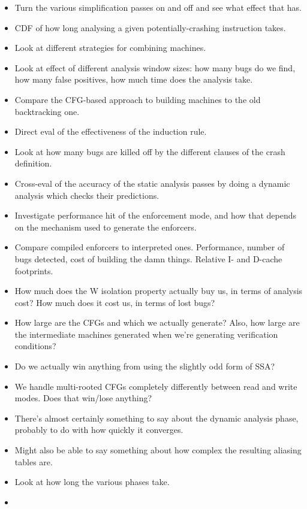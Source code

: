 \begin{itemize}
\item
  Turn the various simplification passes on and off and see what effect that has.
\item
  CDF of how long analysing a given potentially-crashing instruction takes.
\item
  Look at different strategies for combining machines.
\item
  Look at effect of different analysis window sizes: how many bugs do we find, how many false positives, how much time does the analysis take.
\item
  Compare the CFG-based approach to building machines to the old backtracking one.
\item
  Direct eval of the effectiveness of the induction rule.
\item
  Look at how many bugs are killed off by the different clauses of the crash definition.
\item
  Cross-eval of the accuracy of the static analysis passes by doing a dynamic analysis which checks their predictions.
\item
  Investigate performance hit of the enforcement mode, and how that depends on the mechanism used to generate the enforcers.
\item
  Compare compiled enforcers to interpreted ones.
  Performance, number of bugs detected, cost of building the damn things.
  Relative I- and D-cache footprints.
\item
  How much does the W isolation property actually buy us, in terms of analysis cost?
  How much does it cost us, in terms of lost bugs?
\item
  How large are the CFGs and \StateMachines which we actually generate?
  Also, how large are the intermediate machines generated when we're generating verification conditions?
\item
  Do we actually win anything from using the slightly odd form of SSA?
\item
  We handle multi-rooted CFGs completely differently between read and write modes.
  Does that win/lose anything?
\item
  There's almost certainly something to say about the dynamic analysis phase, probably to do with how quickly it converges.
\item
  Might also be able to say something about how complex the resulting aliasing tables are.
\item
  Look at how long the various phases take.
\item

\end{itemize}
